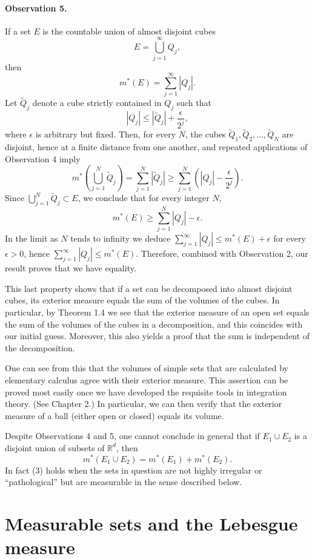 \documentclass[11pt,openany]{book}
\begin{document}
\paragraph{Observation 5.} If a set $E$ is the countable union of almost disjoint cubes
\[
 E=\bigcup_{j=1}^{\infty}Q_j,
\]
then
\[
 m^*(E)=\sum_{j=1}^{\infty}|Q_j|.
\]
Let $\widetilde Q_j$ denote a cube strictly contained in $Q_j$ such that
\[
 |Q_j|\le |\widetilde Q_j|+\frac{\epsilon}{2^j},
\]
where $\epsilon$ is arbitrary but fixed. Then, for every $N$, the cubes $\widetilde Q_1,\widetilde Q_2,\ldots,\widetilde Q_N$ are disjoint, hence at a finite distance from one another, and repeated applications of Observation 4 imply
\[
 m^*\left(\bigcup_{j=1}^N\widetilde Q_j\right)
 =\sum_{j=1}^N|\widetilde Q_j|
 \ge\sum_{j=1}^N\left(|Q_j|-\frac{\epsilon}{2^j}\right).
\]
Since $\bigcup_{j=1}^N\widetilde Q_j\subset E$, we conclude that for every integer $N$,
\[
 m^*(E)\ge\sum_{j=1}^N|Q_j|-\epsilon.
\]
In the limit as $N$ tends to infinity we deduce $\sum_{j=1}^{\infty}|Q_j|\le m^*(E)+\epsilon$ for every $\epsilon>0$, hence $\sum_{j=1}^{\infty}|Q_j|\le m^*(E)$. Therefore, combined with Observation 2, our result proves that we have equality.

This last property shows that if a set can be decomposed into almost disjoint cubes, its exterior measure equals the sum of the volumes of the cubes. In particular, by Theorem 1.4 we see that the exterior measure of an open set equals the sum of the volumes of the cubes in a decomposition, and this coincides with our initial guess. Moreover, this also yields a proof that the sum is independent of the decomposition.

One can see from this that the volumes of simple sets that are calculated by elementary calculus agree with their exterior measure. This assertion can be proved most easily once we have developed the requisite tools in integration theory. (See Chapter 2.) In particular, we can then verify that the exterior measure of a ball (either open or closed) equals its volume.

Despite Observations 4 and 5, one cannot conclude in general that if $E_1\cup E_2$ is a disjoint union of subsets of $\mathbb{R}^d$, then
\begin{equation}
 m^*(E_1\cup E_2)=m^*(E_1)+m^*(E_2).
 \tag{3}
\end{equation}
In fact (3) holds when the sets in question are not highly irregular or ``pathological'' but are measurable in the sense described below.

\section{Measurable sets and the Lebesgue measure}
\end{document}
